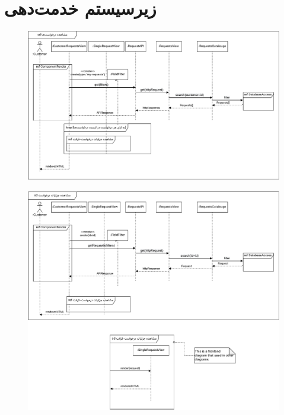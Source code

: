 \eject \pdfpagewidth=13in \pdfpageheight=10in

\section{زیرسیستم خدمت‌دهی}

\eject \pdfpagewidth=9in \pdfpageheight=7in

\begin{figure}[ht!]
	\centering
	\includegraphics[scale=0.8]{figs/design-sequence/3-10.pdf}
\end{figure}
\FloatBarrier
\newpage

\eject \pdfpagewidth=10in \pdfpageheight=10in

\begin{figure}[ht!]
	\centering
	\includegraphics[scale=0.8]{figs/design-sequence/3-11.pdf}
\end{figure}
\FloatBarrier
\newpage


